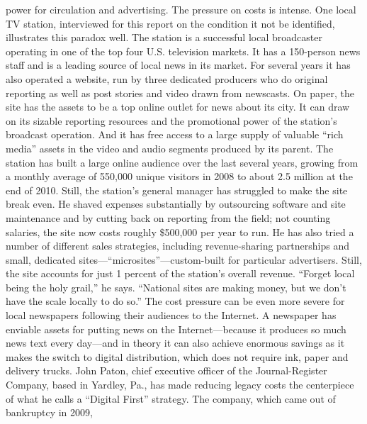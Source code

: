 power for circulation and advertising. The pressure on costs is intense.
One local TV station, interviewed for this report on the condition it not be
identified, illustrates this paradox well. The station is a successful local broadcaster
operating in one of the top four U.S. television markets. It has a 150-person news
staff and is a leading source of local news in its market. For several years it has also
operated a website, run by three dedicated producers who do original reporting
as well as post stories and video drawn from newscasts.
On paper, the site has the assets to be a top online outlet for news about its city.
It can draw on its sizable reporting resources and the promotional power of the
station's broadcast operation. And it has free access to a large supply of valuable
``rich media'' assets in the video and audio segments produced by its parent.
The station has built a large online audience over the last several years, growing
from a monthly average of 550,000 unique visitors in 2008 to about 2.5 million
at the end of 2010. Still, the station's general manager has struggled to make the
site break even. He shaved expenses substantially by outsourcing software and
site maintenance and by cutting back on reporting from the field; not counting
salaries, the site now costs roughly \$500,000 per year to run. He has also tried a
number of different sales strategies, including revenue-sharing partnerships and
small, dedicated sites—``microsites''—custom-built for particular advertisers. Still,
the site accounts for just 1 percent of the station's overall revenue. ``Forget local
being the holy grail,'' he says. ``National sites are making money, but we don't
have the scale locally to do so.''
The cost pressure can be even more severe for local newspapers following their
audiences to the Internet. A newspaper has enviable assets for putting news on
the Internet—because it produces so much news text every day—and in theory
it can also achieve enormous savings as it makes the switch to digital distribution,
which does not require ink, paper and delivery trucks.
John Paton, chief executive officer of the Journal-Register Company, based in
Yardley, Pa., has made reducing legacy costs the centerpiece of what he calls a
``Digital First'' strategy. The company, which came out of bankruptcy in 2009,

